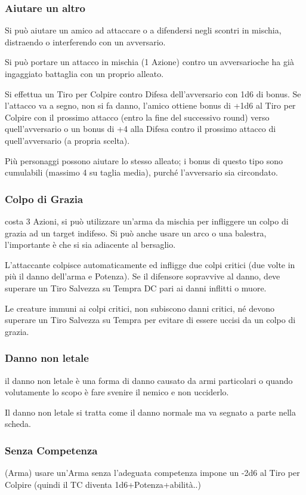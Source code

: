 \documentclass[a4paper,11pt,twoside,openany]{book}
\begin{document}
\subsubsection{Aiutare un altro} Si può aiutare un amico ad attaccare o a difendersi negli scontri in mischia, distraendo o interferendo con un avversario.

Si può portare un attacco in mischia (1 Azione) contro un avversarioche ha già ingaggiato battaglia con un proprio alleato.

Si effettua un Tiro per Colpire contro Difesa dell'avversario con 1d6 di bonus. Se l'attacco va a segno, non si fa danno, l'amico ottiene bonus di +1d6 al Tiro per Colpire con il prossimo attacco (entro la fine del successivo round) verso quell'avversario o un bonus di +4 alla Difesa contro il prossimo attacco di quell'avversario (a propria scelta). 

Più personaggi possono aiutare lo stesso alleato; i bonus di questo tipo sono cumulabili (massimo 4 su taglia media), purché l'avversario sia circondato.

\subsubsection{Colpo di Grazia} costa 3 Azioni, si può utilizzare un'arma da mischia per infliggere un colpo di grazia ad un target indifeso. Si può anche usare un arco o una balestra, l'importante è che si sia adiacente al bersaglio.

L'attaccante colpisce automaticamente ed infligge due colpi critici (due volte in più il danno dell'arma e Potenza). Se il difensore sopravvive al danno, deve superare un Tiro Salvezza su Tempra DC pari ai danni inflitti o muore.

Le creature immuni ai colpi critici, non subiscono danni critici, né devono superare un Tiro Salvezza su Tempra per evitare di essere uccisi da un colpo di grazia.

\subsubsection{Danno non letale} il danno non letale è una forma di danno causato da armi particolari o quando volutamente lo scopo è fare svenire il nemico e non ucciderlo.

Il danno non letale si tratta come il danno normale ma va segnato a parte nella scheda.

\subsubsection{Senza Competenza} (Arma) usare un'Arma senza l'adeguata competenza impone un -2d6 al Tiro per Colpire (quindi il TC diventa 1d6+Potenza+abilità..) 
\end{document}
